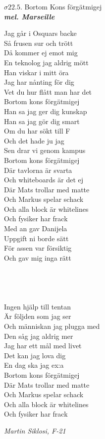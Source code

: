 \documentclass[a6paper,10pt]{article}
\newcommand{\mel}[1]{\small\textbf{\textit{mel. #1 \\}}}
\begin{document}
\begin{center}
\Large $\sigma22.5$. Bortom Kons förgätmigej\\
\mel{Marseille}
\end{center}
Jag går i Osquars backe\\
Så frusen sur och trött\\
Då kommer ej emot mig\\
En teknolog jag aldrig mött
\vspace{5pt}\\
Han viskar i mitt öra\\
Jag har nånting för dig\\
Vet du hur flått man har det\\
Bortom kons förgätmigej
\vspace{5pt}\\
Han sa jag ger dig kunskap\\
Han sa jag gör dig smart\\
Om du har sökt till F\\
Och det hade ju jag
\vspace{5pt}\\
Sen drar vi genom kampus\\
Bortom kons förgätmigej\\
Där tavlorna är svarta\\
Och whiteboards är det ej
\vspace{5pt}\\
Där Mats trollar med matte\\
Och Markus spelar schack\\
Och alla block är whitelines\\
Och fysiker har frack
\vspace{5pt}\\
Med an gav Danijela\\
Uppgift ni borde sätt\\
För assen var försiktig\\
Och gav mig inga rätt
\vspace{5pt}\\
\\
\\
\\
\\
Ingen hjälp till tentan\\
Är följden som jag ser\\
Och människan jag plugga med\\
Den såg jag aldrig mer
\vspace{5pt}\\
Jag har ett mål med livet\\
Det kan jag lova dig\\
En dag ska jag ex:a\\
Bortom kons förgätmigej
\vspace{5pt}\\
Där Mats trollar med matte\\
Och Markus spelar schack\\
Och alla block är whitelines\\
Och fysiker har frack\\

\begin{flushright}
\textit{Martin Siklosi, F-21}
\end{flushright}
\end{document}

